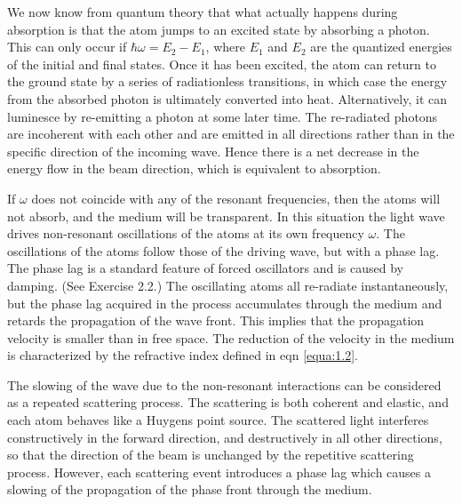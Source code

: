 \documentclass[12pt]{book}
\begin{document}
We now know from quantum theory that what actually happens during absorption is that the atom jumps to an excited state by absorbing a photon. This can only occur if $\hbar\omega=E_2-E_1$, where $E_1$ and $E_2$ are the quantized energies of the initial and final states. Once it has been excited, the atom can return to the ground state by a series of radiationless transitions, in which case the energy from the absorbed photon is ultimately converted into heat. Alternatively, it can luminesce by re-emitting a photon at some later time. The re-radiated photons are incoherent with each other and are emitted in all directions rather than in the specific direction of the incoming wave. Hence there is a net decrease in the energy flow in the beam direction, which is equivalent to absorption.

If $\omega$ does not coincide with any of the resonant frequencies, then the atoms will not absorb, and the medium will be transparent. In this situation the light wave drives non-resonant oscillations of the atoms at its own frequency $\omega$. The oscillations of the atoms follow those of the driving wave, but with a phase lag. The phase lag is a standard feature of forced oscillators and is caused by damping. (See Exercise 2.2.) The oscillating atoms all re-radiate instantaneously, but the phase lag acquired in the process accumulates through the medium and retards the propagation of the wave front. This implies that the propagation velocity is smaller than in free space. The reduction of the velocity in the medium is characterized by the refractive index defined in eqn \ref{equa:1.2}.

The slowing of the wave due to the non-resonant interactions can be considered as a repeated scattering process. The scattering is both coherent and elastic, and each atom behaves like a Huygens point source. The scattered light interferes constructively in the forward direction, and destructively in all other directions, so that the direction of the beam is unchanged by the repetitive scattering process. However, each scattering event introduces a phase lag which causes a slowing of the propagation of the phase front through the medium.
\end{document}
